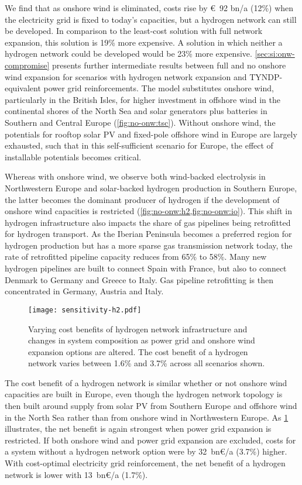 We find that as onshore wind is eliminated, costs rise by \euro~92 bn/a (12\%)
when the electricity grid is fixed to today's capacities, but a hydrogen network
can still be developed. In comparison to the least-cost solution with full
network expansion, this solution is 19\% more expensive. A solution in which
neither a hydrogen network could be developed would be 23\% more expensive.
\cref{sec:si:onw-compromise} presents further intermediate results between full
and no onshore wind expansion for scenarios with hydrogen network expansion and
TYNDP-equivalent power grid reinforcements. The model substitutes onshore wind,
particularly in the British Isles, for higher investment in offshore wind in the
continental shores of the North Sea and solar generators plus batteries in
Southern and Central Europe (\cref{fig:no-onw:tsc}).  Without onshore wind, the
potentials for rooftop solar PV and fixed-pole offshore wind in Europe are
largely exhausted, such that in this self-sufficient scenario for Europe, the
effect of installable potentials becomes critical.

Whereas with onshore wind, we observe both wind-backed electrolysis in
Northwestern Europe and solar-backed hydrogen production in Southern Europe, the
latter becomes the dominant producer of hydrogen if the development of onshore
wind capacities is restricted (\cref{fig:no-onw:h2,fig:no-onw:io}). This shift
in hydrogen infrastructure also impacts the share of gas pipelines being
retrofitted for hydrogen transport. As the Iberian Peninsula becomes a preferred
region for hydrogen production but has a more sparse gas transmission network
today, the rate of retrofitted pipeline capacity reduces from 65\% to 58\%. Many
new hydrogen pipelines are built to connect Spain with France, but also to
connect Denmark to Germany and Greece to Italy. Gas pipeline retrofitting is
then concentrated in Germany, Austria and Italy.

\begin{figure}
    \centering
    \texttt{[image: sensitivity-h2.pdf]}
    \caption{Varying cost benefits of hydrogen network infrastructure and changes in system composition as power grid and onshore wind expansion options are altered. The cost benefit of a hydrogen network varies between 1.6\% and 3.7\% across all scenarios shown.}
    \label{fig:h2-restriction-w-onw}
\end{figure}

The cost benefit of a hydrogen network is similar whether or not onshore wind
capacities are built in Europe, even though the hydrogen network topology is
then built around supply from solar PV from Southern Europe and offshore wind in
the North Sea rather than from onshore wind in Northwestern Europe. As
\cref{fig:h2-restriction-w-onw} illustrates, the net benefit is again strongest
when power grid expansion is restricted. If both onshore wind and power grid
expansion are excluded, costs for a system without a hydrogen network option
were by 32~bn\euro/a (3.7\%) higher. With cost-optimal electricity grid
reinforcement, the net benefit of a hydrogen network is lower with
13~bn\euro/a (1.7\%).

